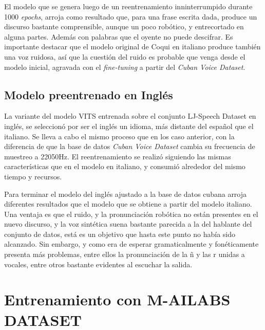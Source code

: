 El modelo que se genera luego de un reentrenamiento inninterrumpido durante 1000 \textit{epochs}, arroja como resultado que, para una frase escrita dada, produce un discurso bastante comprensible, aunque un poco robótico, y entrecortado en alguna partes. Además con palabras que el oyente no puede descifrar. Es importante destacar que el modelo original de Coqui en italiano produce también una voz ruidosa, así que la cuestión del ruido es probable que venga desde el modelo inicial, agravada con el \textit{fine-tuning} a partir del \textit{Cuban Voice Dataset}.


\subsection{Modelo preentrenado en Inglés}
La variante del modelo VITS entrenada sobre el conjunto LJ-Speech Dataset en inglés, se seleccionó por ser el inglés un idioma, más distante del español que el italiano. Se lleva a cabo el mismo proceso que en los caso anterior, con la diferencia de que la base de datos \textit{Cuban Voice Dataset} cambia su frecuencia de muestreo a 22050Hz. 
El reentrenamiento se realizó siguiendo las mismas características que en el modelo en italiano, y consumió alrededor del mismo tiempo y recursos.

Para terminar el modelo del inglés ajustado a la base de datos cubana arroja diferentes resultados que el modelo que se obtiene a partir del modelo italiano. Una ventaja es que el ruido, y la pronunciación robótica no están presentes en el nuevo discurso, y la voz sintética suena bastante parecida a la del hablante del conjunto de datos, está es un objetivo que hasta este punto no había sido alcanzado. Sin embargo, y como era de esperar gramaticalmente y fonéticamente presenta más problemas, entre ellos la pronunciación de la ñ y las r unidas a vocales, entre otros bastante evidentes al escuchar la salida.


\section{Entrenamiento con M-AILABS DATASET}

